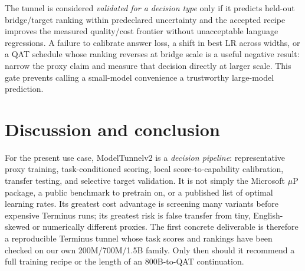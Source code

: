 \documentclass[10pt,a4paper]{article}
\begin{document}
The tunnel is considered \emph{validated for a decision type} only if it predicts held-out bridge/target ranking within predeclared uncertainty and the accepted recipe improves the measured quality/cost frontier without unacceptable language regressions. A failure to calibrate answer loss, a shift in best LR across widths, or a QAT schedule whose ranking reverses at bridge scale is a useful negative result: narrow the proxy claim and measure that decision directly at larger scale. This gate prevents calling a small-model convenience a trustworthy large-model prediction.

\section{Discussion and conclusion}

For the present use case, ModelTunnelv2 is a \emph{decision pipeline}: representative proxy training, task-conditioned scoring, local score-to-capability calibration, transfer testing, and selective target validation. It is not simply the Microsoft $\mu$P package, a public benchmark to pretrain on, or a published list of optimal learning rates. Its greatest cost advantage is screening many variants before expensive Terminus runs; its greatest risk is false transfer from tiny, English-skewed or numerically different proxies. The first concrete deliverable is therefore a reproducible Terminus tunnel whose task scores and rankings have been checked on our own 200M/700M/1.5B family. Only then should it recommend a full training recipe or the length of an 800B-to-QAT continuation.
\end{document}
